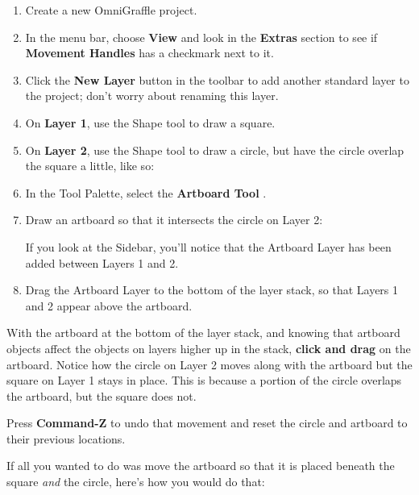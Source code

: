 \documentclass[../main.tex]{subfiles}
\begin{document}
\begin{enumerate}
  \item Create a new OmniGraffle project.
  \item In the menu bar, choose \textbf{View} and look in the \textbf{Extras} section to see if
    \textbf{Movement Handles} has a checkmark next to it.
  \item Click the \textbf{New Layer} button in the toolbar to add another standard layer to the
    project; don't worry about renaming this layer.
  \item On \textbf{Layer 1}, use the Shape tool to draw a square.
  \item On \textbf{Layer 2}, use the Shape tool to draw a circle, but have the circle overlap
    the square a little, like so:

  \item In the Tool Palette, select the \textbf{Artboard Tool}
    .
  \item Draw an artboard so that it intersects the circle on Layer 2:


    If you look at the Sidebar, you'll notice that the Artboard Layer has been added between
    Layers 1 and 2.
  \item Drag the Artboard Layer to the bottom of the layer stack, so that Layers 1 and 2 appear
    above the artboard.

\end{enumerate}

With the artboard at the bottom of the layer stack, and knowing that artboard objects affect the
objects on layers higher up in the stack, \textbf{click and drag} on the artboard. Notice how
the circle on Layer 2 moves along with the artboard but the square on Layer 1 stays in place.
This is because a portion of the circle overlaps the artboard, but the square does not.


Press \textbf{Command-Z} to undo that movement and reset the circle and artboard to their
previous locations.

If all you wanted to do was move the artboard so that it is placed beneath the square
\textit{and} the circle, here's how you would do that:
\end{document}
